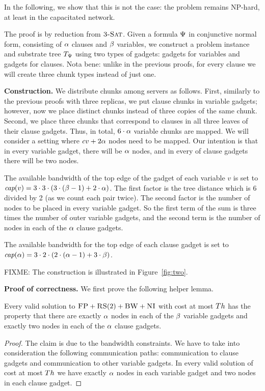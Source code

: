 In the following, we show that this is not the case: the problem remains
NP-hard, at least in the capacitated network.

The proof is by reduction from $\textsc{3-Sat}$. Given a formula $\Psi$ in
conjunctive normal form, consisting of $\alpha$ clauses and $\beta$ variables, we construct a problem instance and substrate tree
$T_{\Psi}$ using two types of gadgets: gadgets for variables and
gadgets for clauses. Nota bene:
unlike in the previous proofs, for every clause we will create three chunk types instead of just one.

\textbf{Construction.}
We distribute chunks among servers as follows. First,
similarly to the previous proofs with three replicas, we put clause chunks in
variable gadgets; however, now we place distinct chunks instead of
three copies of the same chunk. Second, we place three chunks that
correspond to clauses in all three leaves of their clause gadgets.
Thus, in total, $6 \cdot \alpha$ variable chunks are mapped.
We will consider a setting where $cv + 2\alpha$ nodes need to be mapped. Our intention is that in
every variable gadget, there will be $\alpha$ nodes,
 and in every of clause
gadgets there will be two nodes.

The available bandwidth of the top edge of the gadget of each variable $v$ is set to
$\emph{cap}(v) = 3  \cdot  3  \cdot  (3  \cdot  (\beta - 1) + 2  \cdot  \alpha) $.
The first factor is the tree distance which is 6 divided by 2 (as
we count each pair twice). The second factor is
the number of nodes to be placed in every variable gadget.
So the first term of the
sum is three times the number of outer variable gadgets,
and the second term is the
number of nodes in each of the $\alpha$ clause gadgets.

The available bandwidth for the top edge of each clause gadget is set to
$\emph{cap}(\alpha) = 3  \cdot  2  \cdot  (2  \cdot  (\alpha - 1) + 3  \cdot  \beta) $.

FIXME: The construction is illustrated in Figure~\ref{fig:two}.


\textbf{Proof of correctness.}
We first prove the following helper lemma.
\begin{lemma}
Every valid solution to $\textsc{FP}+\textsc{RS}(2)+\textsc{BW}+\textsc{NI}$
with cost at most $Th$ has the property that
there are exactly $\alpha$ nodes in each of the $\beta$ variable gadgets
and exactly two nodes in each of the $\alpha$ clause gadgets.
\end{lemma}
\begin{proof}
The claim is due to the bandwidth constraints. We have to take into
consideration the following communication paths:
communication to clause gadgets and
communication to
other variable gadgets.
In every valid solution of cost at most $Th$ we have exactly
$\alpha$ nodes in each variable gadget and two nodes in each clause gadget.
\end{proof}


